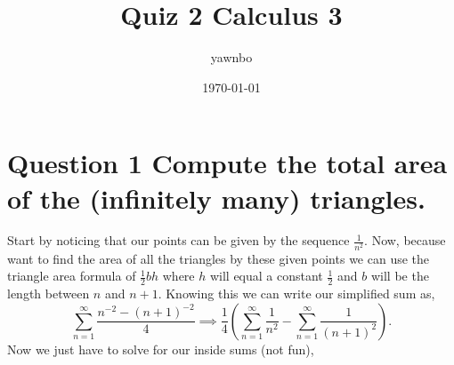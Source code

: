 \documentclass[a4paper]{article}
\title{Quiz 2 Calculus 3}
\author{yawnbo}
\date{\today}
\begin{document}
\maketitle
\section{Question 1 Compute the total area of the (infinitely many) triangles.}%
\label{sec:Question 1 Compute the total area of the (infinitely many) triangles.}

Start by noticing that our points can be given by the sequence $ \frac{ 1 }{ n^2 }  $. Now, because want to find the area of all the triangles by these given points we can use the triangle area formula of $ \frac{ 1 }{ 2 } bh $ where $ h $ will equal a constant $ \frac{ 1 }{ 2 }  $ and $ b $ will be the length between $ n $ and $ n+1 $. Knowing this we can write our simplified sum as,
\[
\sum_{ n=1 } ^{ \infty } \frac{ n^{ -2 }-\left( n+1 \right) ^{ -2 } }{ 4 } \implies \frac{ 1 }{ 4 } \left( \sum_{ n=1 } ^{ \infty } \frac{ 1 }{ n^2 }  - \sum_{ n=1 } ^{ \infty } \frac{ 1 }{ \left( n+1 \right) ^2 } \right) 
.\] 
Now we just have to solve for our inside sums (not fun),
\end{document}
